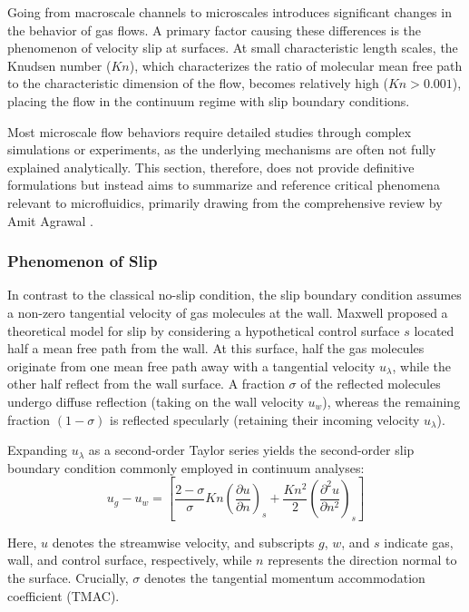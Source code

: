 Going from macroscale channels to microscales introduces significant changes in the behavior of gas flows.
A primary factor causing these differences is the phenomenon of velocity slip at surfaces.
At small characteristic length scales, the Knudsen number ($Kn$), which characterizes the ratio of molecular mean free path to the characteristic dimension of the flow, becomes relatively high ($Kn > 0.001$), placing the flow in the continuum regime with slip boundary conditions.

Most microscale flow behaviors require detailed studies through complex simulations or experiments, as the underlying mechanisms are often not fully explained analytically.
This section, therefore, does not provide definitive formulations but instead aims to summarize and reference critical phenomena relevant to microfluidics, primarily drawing from the comprehensive review by Amit Agrawal \cite{agrawal_comprehensive_2011}.

\subsubsection*{Phenomenon of Slip}
	In contrast to the classical no-slip condition, the slip boundary condition assumes a non-zero tangential velocity of gas molecules at the wall.
	Maxwell proposed a theoretical model for slip by considering a hypothetical control surface $s$ located half a mean free path from the wall.
	At this surface, half the gas molecules originate from one mean free path away with a tangential velocity $u_\lambda$, while the other half reflect from the wall surface.
	A fraction $\sigma$ of the reflected molecules undergo diffuse reflection (taking on the wall velocity $u_w$), whereas the remaining fraction $(1 - \sigma)$ is reflected specularly (retaining their incoming velocity $u_\lambda$).

	Expanding $u_\lambda$ as a second-order Taylor series yields the second-order slip boundary condition commonly employed in continuum analyses:
	\begin{equation}
		u_g - u_w =
		\left[
			\frac{2-\sigma}{\sigma}Kn\left(\frac{\partial u}{\partial n}\right)_s
			+ \frac{Kn^2}{2} \left(\frac{\partial^2 u}{\partial n^2}\right)_s
		\right]
	\end{equation}

	Here, $u$ denotes the streamwise velocity, and subscripts $g$, $w$, and $s$ indicate gas, wall, and control surface, respectively, while $n$ represents the direction normal to the surface.
	Crucially, $\sigma$ denotes the tangential momentum accommodation coefficient (TMAC).

